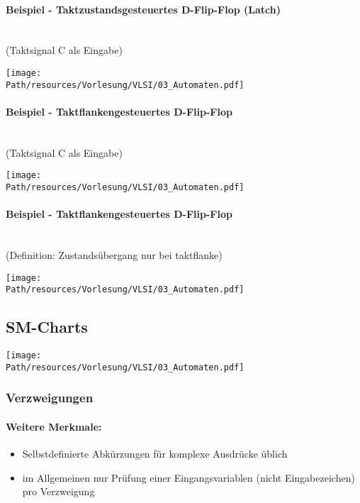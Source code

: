 		\paragraph{Beispiel - Taktzustandsgesteuertes D-Flip-Flop (Latch)}\hfill\\
		(Taktsignal C als Eingabe) 
		\begin{center}
			\texttt{[image: \\Path/resources/Vorlesung/VLSI/03\_Automaten.pdf]}
		\end{center}
	
		\paragraph{Beispiel - Taktflankengesteuertes D-Flip-Flop}\hfill\\
		(Taktsignal C als Eingabe) 
		\begin{center}
			\texttt{[image: \\Path/resources/Vorlesung/VLSI/03\_Automaten.pdf]}
		\end{center}
	
		\paragraph{Beispiel - Taktflankengesteuertes D-Flip-Flop}\hfill\\
		(Definition: Zustandsübergang nur bei taktflanke) 
		\begin{center}
			\texttt{[image: \\Path/resources/Vorlesung/VLSI/03\_Automaten.pdf]}
		\end{center}
	
\subsection{SM-Charts}
	\begin{center}
		\texttt{[image: \\Path/resources/Vorlesung/VLSI/03\_Automaten.pdf]}
	\end{center}
	
	\subsubsection{Verzweigungen}
		\paragraph{Weitere Merkmale:}
		\begin{itemize}
			\item Selbstdefinierte Abkürzungen für komplexe Ausdrücke üblich
			\item im Allgemeinen nur Prüfung einer Eingangsvariablen (nicht Eingabezeichen) pro Verzweigung
		\end{itemize}
